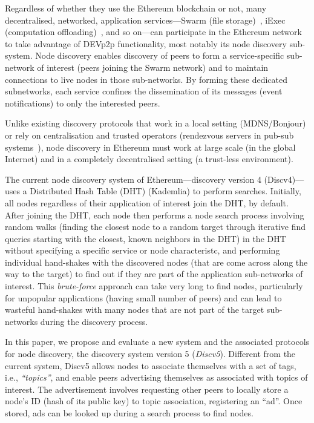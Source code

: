 Regardless of whether they use the Ethereum blockchain or not, many decentralised, networked, application services---\eg Swarm (file storage)~\cite{}, iExec (computation offloading)~\cite{}, and so on---can participate in the Ethereum network to take advantage of DEVp2p functionality, most notably its node discovery sub-system. Node discovery enables discovery of peers to form a service-specific sub-network of interest (\eg peers joining the Swarm network) and to maintain connections to live nodes in those sub-networks. By forming these dedicated subnetworks, each service confines the dissemination of its messages (\eg event notifications) to only the interested peers.

Unlike existing discovery protocols that work in a local setting (MDNS/Bonjour) or rely on centralisation and trusted operators (\eg rendezvous servers in pub-sub systems~\cite{}), node discovery in Ethereum must work at large scale (in the global Internet) and in a completely decentralised setting  (\ie a trust-less environment). 

The current node discovery system of Ethereum---\ie discovery version 4 (Discv4)---uses a Distributed Hash Table (DHT) (Kademlia) to perform searches. Initially, all nodes regardless of their application of interest join the DHT, by default. After joining the DHT, each node then performs a node search process involving random walks (\ie finding the closest node to a random target through iterative find queries starting with the closest, known neighbors in the DHT) in the DHT without specifying a specific service or node characteristc, and performing individual hand-shakes with the discovered nodes (that are come across along the way to the target) to find out if they are part of the application sub-networks of interest. This \emph{brute-force} approach can take very long to find nodes, particularly for unpopular applications (\ie having small number of peers) and can lead to wasteful hand-shakes with many nodes that are not part of the target sub-networks during the discovery process. 

In this paper, we propose and evaluate a new system and the associated protocols for node discovery, \ie the discovery system version 5 (\textit{Discv5}). Different from the current system, Discv5 allows nodes to associate themselves with a set of tags, i.e., \textit{``topics''}, and enable peers advertising themselves as associated with topics of interest. The advertisement involves requesting other peers to locally store a node's ID (hash of its public key) to topic association, \ie  registering an ``ad''. Once stored, ads can be looked up during a search process to find nodes. 

